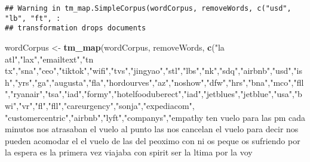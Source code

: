 \documentclass[
]{article}
\newenvironment{Shaded}{\begin{snugshade}}{\end{snugshade}}
\newcommand{\FunctionTok}[1]{\textcolor[rgb]{0.13,0.29,0.53}{\textbf{#1}}}
\newcommand{\NormalTok}[1]{#1}
\newcommand{\OtherTok}[1]{\textcolor[rgb]{0.56,0.35,0.01}{#1}}
\newcommand{\StringTok}[1]{\textcolor[rgb]{0.31,0.60,0.02}{#1}}
\begin{document}
\begin{verbatim}
## Warning in tm_map.SimpleCorpus(wordCorpus, removeWords, c("usd", "lb", "ft", :
## transformation drops documents
\end{verbatim}

\begin{Shaded}
\begin{Highlighting}[]
\NormalTok{wordCorpus }\OtherTok{\textless{}{-}} \FunctionTok{tm\_map}\NormalTok{(wordCorpus, removeWords, }\FunctionTok{c}\NormalTok{(}\StringTok{"la atl"}\NormalTok{,}\StringTok{"lax"}\NormalTok{,}\StringTok{"emailtext"}\NormalTok{,}\StringTok{"tn tx"}\NormalTok{,}\StringTok{"sna"}\NormalTok{,}\StringTok{"ceo"}\NormalTok{,}\StringTok{"tiktok"}\NormalTok{,}\StringTok{"wifi"}\NormalTok{,}\StringTok{"tvs"}\NormalTok{,}\StringTok{"jingyao"}\NormalTok{,}\StringTok{"stl"}\NormalTok{,}\StringTok{"lbs"}\NormalTok{,}\StringTok{"nk"}\NormalTok{,}\StringTok{"sdq"}\NormalTok{,}\StringTok{"airbnb"}\NormalTok{,}\StringTok{"usd"}\NormalTok{,}\StringTok{"ish"}\NormalTok{,}\StringTok{"yrs"}\NormalTok{,}\StringTok{"ga"}\NormalTok{,}\StringTok{"augusta"}\NormalTok{,}\StringTok{"fla"}\NormalTok{,}\StringTok{"hordourves"}\NormalTok{,}\StringTok{"az"}\NormalTok{,}\StringTok{"noshow"}\NormalTok{,}\StringTok{"dfw"}\NormalTok{,}\StringTok{"hrs"}\NormalTok{,}\StringTok{"bna"}\NormalTok{,}\StringTok{"mco"}\NormalTok{,}\StringTok{"fll"}\NormalTok{,}\StringTok{"ryanair"}\NormalTok{,}\StringTok{"tsa"}\NormalTok{,}\StringTok{"iad"}\NormalTok{,}\StringTok{"formy"}\NormalTok{,}\StringTok{"hotelfooduberect"}\NormalTok{,}\StringTok{"iad"}\NormalTok{,}\StringTok{"jetblues"}\NormalTok{,}\StringTok{"jetblue"}\NormalTok{,}\StringTok{"usa"}\NormalTok{,}\StringTok{"bwi"}\NormalTok{,}\StringTok{"vr"}\NormalTok{,}\StringTok{"fl"}\NormalTok{,}\StringTok{"fll"}\NormalTok{,}\StringTok{"careurgency"}\NormalTok{,}\StringTok{"sonja"}\NormalTok{,}\StringTok{"expediacom"}\NormalTok{,}
                                                \StringTok{"customercentric"}\NormalTok{,}\StringTok{"airbnb"}\NormalTok{,}\StringTok{"lyft"}\NormalTok{,}\StringTok{"companys"}\NormalTok{,}\StringTok{"empathy ten vuelo para las pm cada minutos nos atrasaban el vuelo al punto las nos cancelan el vuelo para decir nos pueden acomodar el el vuelo de las del peoximo con ni os peque os sufriendo por la espera es la primera vez viajaba con spirit ser la ltima por la voy }

\end{Highlighting}
\end{Shaded}
\end{document}
